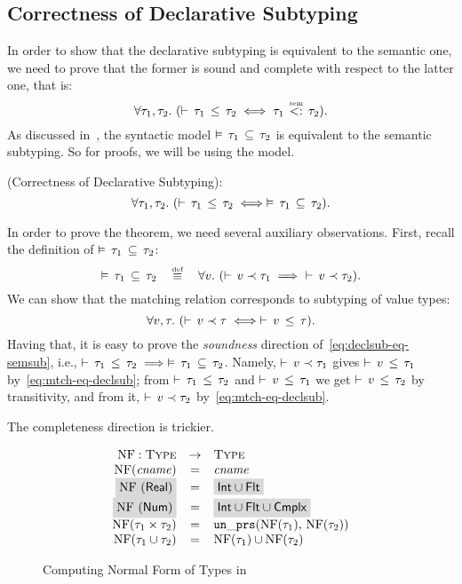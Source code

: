 \subsection{Correctness of Declarative Subtyping}

In order to show that the declarative subtyping is equivalent
to the semantic one,
we need to prove that the former is sound and complete with respect
to the latter one, that is:
\[
\forall \ty_1, \ty_2.\ (\bjsub{\ty_1}{\ty_2} \iff \bjtruesemsub{\ty_1}{\ty_2}).
\]
As discussed in~, 
the syntactic model $\vDash \, \tau_1 \, \subseteq \, \tau_2$ is equivalent 
to the semantic subtyping.
So for proofs, we will be using the model.

\noindent
\Theorem (Correctness of Declarative Subtyping):
\begin{equation}\label{eq:declsub-eq-semsub}
\forall \tau_1, \tau_2.\ (\vdash \, \tau_1 \, \leq \, \tau_2 \iff \vDash \, \tau_1 \, \subseteq \, \tau_2).
\end{equation}

In order to prove the theorem, we need several auxiliary observations.
First, recall the definition of $\vDash \, \tau_1 \, \subseteq \, \tau_2$:
\[
\bjsemsub{\ty_1}{\ty_2} \quad \defsign \quad
\forall \vty.\ (\bjmtch{\vty}{\ty_1} \implies\ \bjmtch{\vty}{\ty_2}).
\]
We can show that the matching relation corresponds to subtyping of
value types:
\begin{equation}\label{eq:mtch-eq-declsub}
\forall v, \tau.\ (\vdash \, v \prec \tau \iff \vdash \, v \, \leq \, \tau).
\end{equation}
Having that, it is easy to prove 
the \emph{soundness} direction
of~\eqref{eq:declsub-eq-semsub}, i.e., 
$\vdash \, \tau_1 \, \leq \, \tau_2 \implies \vDash \, \tau_1 \, \subseteq \, \tau_2$.
Namely, $\vdash \, v \prec \tau_1$ gives $\vdash \, v \, \leq \, \tau_1$ by~\eqref{eq:mtch-eq-declsub}; 
from $\vdash \, \tau_1 \, \leq \, \tau_2$ and $\vdash \, v \, \leq \, \tau_1$
we get $\vdash \, v \, \leq \, \tau_2$ by transitivity, and from it,
$\vdash \, v \prec \tau_2$ by~\eqref{eq:mtch-eq-declsub}.

The completeness direction is trickier.

\begin{figure}
  \[
	\begin{array}{rcl}
	\NF: \Type &\rightarrow& \Type \\
	\NF(\cname) &=& \cname \\
	\colorbox{light-gray}{\NF(\tyreal)} &=&
	\colorbox{light-gray}{\tyunion{\tyint}{\tyflt}} \\
	\colorbox{light-gray}{\NF(\tynum)} &=&
	\colorbox{light-gray}{\tyunion{\tyunion{\tyint}{\tyflt}}{\tycmplx}} \\
	\NF(\typair{\ty_1}{\ty_2}) &=& \unprs(\NF(\ty_1), \, \NF(\ty_2))	\\
	\NF(\tyunion{\ty_1}{\ty_2}) &=& \tyunion{\NF(\ty_1)}{\NF(\ty_2)} \\
	\end{array}
  \]
	\caption{Computing Normal Form of Types in \BetaJulia}
	\label{fig:bjsem-calc-nf}
\end{figure}
